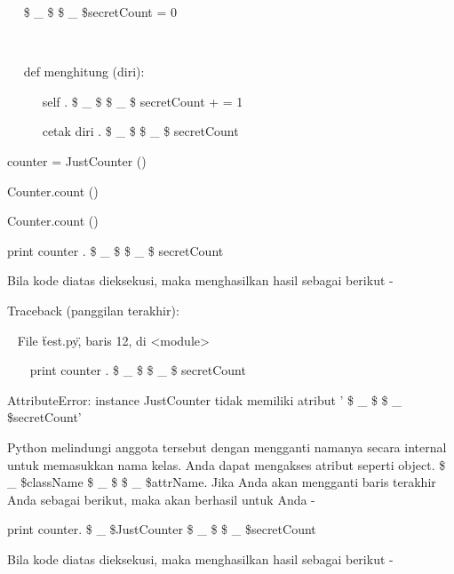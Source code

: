 \begin{12pt}
\begin{12pt}
\begin{12pt}
\begin{12pt}
\begin{12pt}
\begin{12pt}
\begin{12pt}
\begin{12pt}
\begin{12pt}
\begin{12pt}
\begin{12pt}
\begin{12pt}
\begin{12pt}
\begin{12pt}
\begin{12pt}
\begin{12pt}
\begin{12pt}
\begin{12pt}
\begin{12pt}
\noindent 
~~  \$  \_  \$ \$  \_  \$secretCount = 0 \par
\noindent 
~  \par
\noindent 
~~ def menghitung (diri): \par
\noindent 
~~~~~ self . \$  \_  \$ \$  \_  \$ secretCount + = 1 \par
\noindent 
~~~~~ cetak diri . \$  \_  \$ \$  \_  \$ secretCount \par
\vspace{12pt}
\noindent 
counter = JustCounter () \par
\noindent 
Counter.count () \par
\noindent 
Counter.count () \par
\noindent 
print counter . \$  \_  \$ \$  \_  \$ secretCount \par
\vspace{12pt}
\noindent 
Bila kode diatas dieksekusi, maka menghasilkan hasil sebagai berikut - \par
\vspace{12pt}
 \par
{} \par
\noindent 
Traceback (panggilan terakhir): \par
\noindent 
~ File \"test.py\", baris 12, di <module> \par
\noindent 
~~~ print counter . \$  \_  \$ \$  \_  \$ secretCount \par
\noindent 
AttributeError: instance JustCounter tidak memiliki atribut ' \$  \_  \$ \$  \_  \$secretCount' \par
\vspace{12pt}
Python melindungi anggota tersebut dengan mengganti namanya secara internal untuk memasukkan nama kelas. Anda dapat mengakses atribut seperti object. \$  \_  \$className \$  \_  \$ \$  \_  \$attrName. Jika Anda akan mengganti baris terakhir Anda sebagai berikut, maka akan berhasil untuk Anda - \par
\vspace{12pt}
\noindent 
print counter. \$  \_  \$JustCounter \$  \_  \$ \$  \_  \$secretCount \par
\vspace{12pt}
\noindent 
Bila kode diatas dieksekusi, maka menghasilkan hasil sebagai berikut - \par
\vspace{12pt}
 \par
{} \par
{} \par

\end{12pt}
\end{12pt}
\end{12pt}
\end{12pt}
\end{12pt}
\end{12pt}
\end{12pt}
\end{12pt}
\end{12pt}
\end{12pt}
\end{12pt}
\end{12pt}
\end{12pt}
\end{12pt}
\end{12pt}
\end{12pt}
\end{12pt}
\end{12pt}
\end{12pt}
